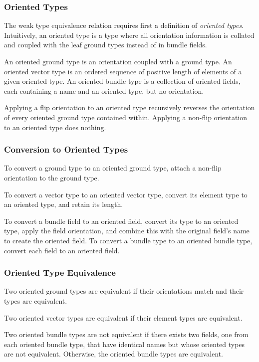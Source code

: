\documentclass[12pt]{article}
\begin{document}
\subsubsection{Oriented Types}
The weak type equivalence relation requires first a definition of {\em oriented types}. Intuitively, an oriented type is a type where all orientation information is collated and coupled with the leaf ground types instead of in bundle fields.

An oriented ground type is an orientation coupled with a ground type. An oriented vector type is an ordered sequence of positive length of elements of a given oriented type. An oriented bundle type is a collection of oriented fields, each containing a name and an oriented type, but no orientation.

Applying a flip orientation to an oriented type recursively reverses the orientation of every oriented ground type contained within. Applying a non-flip orientation to an oriented type does nothing.

\subsubsection{Conversion to Oriented Types}
To convert a ground type to an oriented ground type, attach a non-flip orientation to the ground type.

To convert a vector type to an oriented vector type, convert its element type to an oriented type, and retain its length.

To convert a bundle field to an oriented field, convert its type to an oriented type, apply the field orientation, and combine this with the original field's name to create the oriented field. To convert a bundle type to an oriented bundle type, convert each field to an oriented field.

\subsubsection{Oriented Type Equivalence}
Two oriented ground types are equivalent if their orientations match and their types are equivalent.

Two oriented vector types are equivalent if their element types are equivalent.

Two oriented bundle types are not equivalent if there exists two fields, one from each oriented bundle type, that have identical names but whose oriented types are not equivalent. Otherwise, the oriented bundle types are equivalent.
\end{document}
